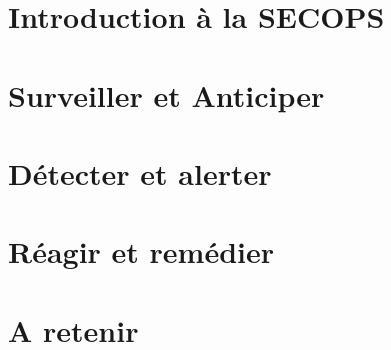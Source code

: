 
\chapter{Introduction à la SECOPS}





\chapter{Surveiller et Anticiper}












\chapter{Détecter et alerter}













\chapter{Réagir et remédier}









\chapter{A retenir}







